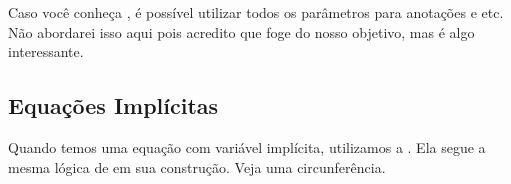 \documentclass[letterpaper,10pt,english]{jupyterBook}
\begin{document}
\sphinxAtStartPar
Caso você conheça , é possível utilizar todos os parâmetros para anotações e etc. Não abordarei isso aqui pois acredito que foge do nosso objetivo, mas é algo interessante.

\begin{sphinxVerbatim}[commandchars=\\\{\}]
                
\PYG{p}{[}\PYG{p}{]}  
\PYG{p}{[}\PYG{p}{]}  
\end{sphinxVerbatim}

\noindent{}


\subsection{Equações Implícitas}
\label{\detokenize{chapters/5:equacoes-implicitas}}
\sphinxAtStartPar
Quando temos uma equação com variável implícita, utilizamos a . Ela segue a mesma lógica de  em sua construção. Veja uma circunferência.

\begin{sphinxVerbatim}[commandchars=\\\{\}]
      
\end{sphinxVerbatim}

\noindent{}
\end{document}
